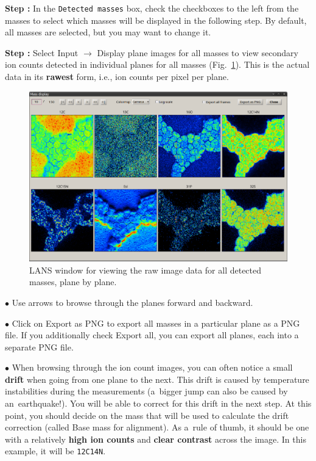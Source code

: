 \documentclass[a4paper, 11pt]{article}
\newcommand{\ttt}[1]{\texttt{#1}}
\newcommand{\lans}[1]{{\color{magenta}#1}}
\newcommand{\lanscb}[1]{{\color{darkgreen}#1}}
\newcommand{\lanstf}[1]{{\color{cyan}#1}}
\newcommand\ra{\rightarrow}
\newcounter{step}
\newcommand\s{\addtocounter{step}{1}\vskip5pt\noindent\textbf{Step \thestep:}{ }}
\newcommand\bul{\vskip5pt\noindent$\bullet${ }}
\newcommand\bb[1]{\textbf{#1}}
\begin{document}
\s In the \ttt{Detected masses} box, check the \lanscb{checkboxes}  to the left from the \lanstf{masses} to select which masses will be displayed in the following step. By default, all masses are selected, but you may want to change it.

\s Select \lans{Input} $\ra$ \lans{Display plane images for all masses} to view secondary ion counts detected in individual planes for all masses (Fig.~\ref{fig:displayplanes}). This is the actual data in its \bb{rawest} form, i.e., ion counts per pixel per plane.

\begin{figure}[!ht]
\centering
\includegraphics[width=\textwidth]{figs3/LANS-display-planes-raw}
\caption{\label{fig:displayplanes}%
LANS window for viewing the raw image data for all detected masses, plane by plane.}
\end{figure}

\bul Use arrows to browse through the planes forward and backward.

\bul Click on \lans{Export as PNG} to export all masses in a particular plane as a PNG file. If you additionally check \lanscb{Export all}, you can export all planes, each into a separate PNG file.

\bul
When browsing through the ion count images, you can often notice a small \bb{drift} when going from one plane to the next. This drift is caused by temperature instabilities during the measurements (a~bigger jump can also be caused by an~earthquake!). You will be able to correct for this drift in the next step. At this point, you should decide on the mass that will be used to calculate the drift correction (called \lanstf{Base mass for alignment}). As a~rule of thumb, it should be one with a relatively \bb{high ion counts} and \bb{clear contrast} across the image. In this example, it will be \ttt{12C14N}.
\end{document}
